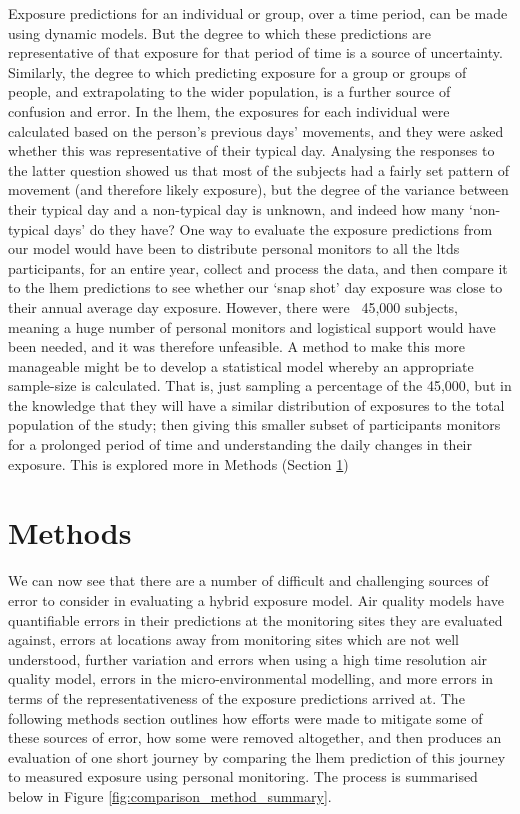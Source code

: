 Exposure predictions for an individual or group, over a time period, can be made using dynamic models. But the degree to which these predictions are representative of that exposure for that period of time is a source of uncertainty. Similarly, the degree to which predicting exposure for a group or groups of people, and extrapolating to the wider population, is a further source of confusion and error. In the \gls{lhem}, the exposures for each individual were calculated based on the person’s previous days’ movements, and they were asked whether this was representative of their typical day. Analysing the responses to the latter question showed us that most of the subjects had a fairly set pattern of movement (and therefore likely exposure), but the degree of the variance between their typical day and a non-typical day is unknown, and indeed how many ‘non-typical days’ do they have? One way to evaluate the exposure predictions from our model would have been to distribute personal monitors to all the \gls{ltds} participants, for an entire year, collect and process the data, and then compare it to the \gls{lhem} predictions to see whether our ‘snap shot’ day exposure was close to their annual average day exposure. However, there were ~45,000 subjects, meaning a huge number of personal monitors and logistical support would have been needed, and it was therefore unfeasible. A method to make this more manageable might be to develop a statistical model whereby an appropriate sample-size is calculated. That is, just sampling a percentage of the 45,000, but in the knowledge that they will have a similar distribution of exposures to the total population of the study; then giving this smaller subset of participants monitors for a prolonged period of time and understanding the daily changes in their exposure. This is explored more in Methods (Section \ref{sec:4methods}) 

\section{Methods}
\label{sec:4methods}

We can now see that there are a number of difficult and challenging sources of error to consider in evaluating a hybrid exposure model. Air quality models have quantifiable errors in their predictions at the monitoring sites they are evaluated against, errors at locations away from monitoring sites which are not well understood, further variation and errors when using a high time resolution air quality model, errors in the micro-environmental modelling, and more errors in terms of the representativeness of the exposure predictions arrived at. The following methods section outlines how efforts were made to mitigate some of these sources of error, how some were removed altogether, and then produces an evaluation of one short journey by comparing the \gls{lhem} prediction of this journey to measured exposure using personal monitoring. The process is summarised below in Figure \ref{fig:comparison_method_summary}.

